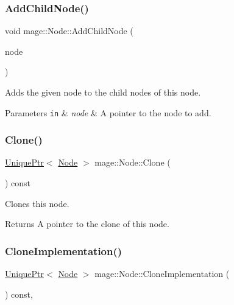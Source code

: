 \subsubsection{\texorpdfstring{Add\+Child\+Node()}{AddChildNode()}}
{\footnotesize\ttfamily void mage\+::\+Node\+::\+Add\+Child\+Node (\begin{DoxyParamCaption}\item[{\hyperlink{namespacemage_a1e01ae66713838a7a67d30e44c67703e}{Shared\+Ptr}$<$ \hyperlink{classmage_1_1_node}{Node} $>$}]{node }\end{DoxyParamCaption})}

Adds the given node to the child nodes of this node.


\begin{DoxyParams}[1]{Parameters}
\mbox{\tt in}  & {\em node} & A pointer to the node to add. \\
\hline
\end{DoxyParams}
\hypertarget{classmage_1_1_node_a18e08151571435d319be2414474c93c0}{}\label{classmage_1_1_node_a18e08151571435d319be2414474c93c0} 
\subsubsection{\texorpdfstring{Clone()}{Clone()}}
{\footnotesize\ttfamily \hyperlink{namespacemage_a3316d7143a973e37adf1110f2e80ca31}{Unique\+Ptr}$<$ \hyperlink{classmage_1_1_node}{Node} $>$ mage\+::\+Node\+::\+Clone (\begin{DoxyParamCaption}{ }\end{DoxyParamCaption}) const}

Clones this node.

\begin{DoxyReturn}{Returns}
A pointer to the clone of this node. 
\end{DoxyReturn}
\hypertarget{classmage_1_1_node_a71a4763bfd4cba5653488b490e61dc8f}{}\label{classmage_1_1_node_a71a4763bfd4cba5653488b490e61dc8f} 
\subsubsection{\texorpdfstring{Clone\+Implementation()}{CloneImplementation()}}
{\footnotesize\ttfamily \hyperlink{namespacemage_a3316d7143a973e37adf1110f2e80ca31}{Unique\+Ptr}$<$ \hyperlink{classmage_1_1_node}{Node} $>$ mage\+::\+Node\+::\+Clone\+Implementation (\begin{DoxyParamCaption}{ }\end{DoxyParamCaption}) const\hspace{0.3cm}{\ttfamily [private]}, {\ttfamily [virtual]}}

